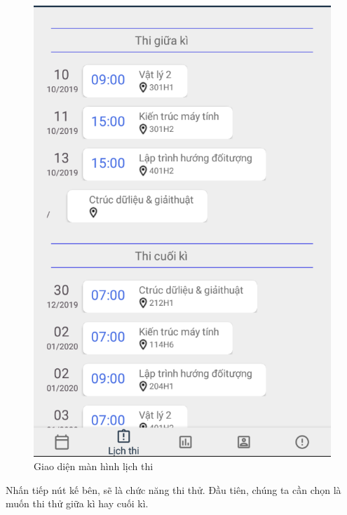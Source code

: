 \documentclass[a4paper]{article}
\begin{document}
\begin{figure}[H]
    \centering
    \includegraphics[scale=.3]{exam_ui.png}
    \caption{Giao diện màn hình lịch thi}
\end{figure}
Nhấn tiếp nút kế bên, sẽ là chức năng thi thử. Đầu tiên, chúng ta cần chọn là muốn thi thử giữa kì hay cuối kì.
\end{document}
